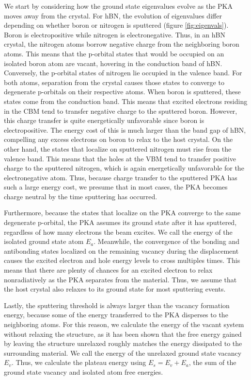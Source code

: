 \documentclass[twoside,twocolumn,9pt]{article}
\begin{document}
We start by considering how the ground state eigenvalues evolve as the PKA
moves away from the crystal.  For hBN, the evolution of eigenvalues differ
depending on whether boron or nitrogen is sputtered (figure
\ref{fig:eigenvals}).  Boron is electropositive while nitrogen is
electronegative.  Thus, in an hBN crystal, the nitrogen atoms borrow negative
charge from the neighboring boron atoms.  This means that the p-orbital states
that would be occupied on an isolated boron atom are vacant, hovering in
the conduction band of hBN.  Conversely, the p-orbital states of nitrogen lie
occupied in the valence band.
For both atoms, separation from the crystal causes those states to converge to
degenerate p-orbitals on their respective atoms.
When boron is sputtered, these states come from the conduction band.
This means that excited electrons residing in the CBM tend to transfer
negative charge to the sputtered boron.  However, this charge transfer is quite
energetically unfavorable since boron is electropositive. The energy cost of
this is much larger than the band gap of hBN, compelling any excess electrons
on boron to relax to the host crystal. On the other hand, the states that
localize on sputtered nitrogen must rise from the valence band.
This means that the holes at the VBM tend to transfer positive charge to the
sputtered nitrogen, which is again energetically unfavorable for the
electronegative atom.
Thus, because charge transfer to the sputtered PKA has such a large energy
cost, we presume that in most cases, the PKA becomes charge neutral by the time
sputtering has occurred.

Furthermore, because the states that localize on the PKA converge to the same
degenerate p-orbital, the PKA assumes its ground state after it has sputtered,
regardless of how many electrons the beam excites.
We call the energy of the isolated ground state atom $E_a$.
Meanwhile, the convergence of the bonding and antibonding states localized on
the remaining vacancy during the displacement causes the excited electron and
hole energy levels to cross multiples times.
This means that there are plenty of chances for an excited electron to relax
nonradiatively as the PKA separates from the material.
Thus, we assume that the host crystal also relaxes to its ground state for most
sputtering events.

Lastly, the sputtering threshold is always larger than the vacancy formation
energy, because some of the energy transferred to the PKA disperses to the
neighboring atoms.
For this reason, we calculate the energy of the vacant system without relaxing
the structure, as it has been shown that the free energy gained by leaving the
structure unrelaxed roughly matches the energy dissipated to the
surrounding material.\cite{Komsa2012}
We call the energy of the unrelaxed ground state vacancy $E_v$.
Thus, we calculate the plateau energy using $E_s = E_v + E_a$, the sum of the
ground state vacancy and isolated atom free energies.
\end{document}
